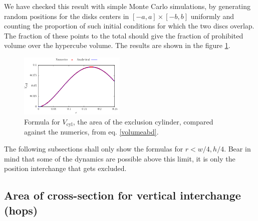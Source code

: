 \documentclass[letterpaper,10pt, jcp, aps]{revtex4-1}
\begin{document}



We have checked this result with simple Monte Carlo simulations, 
by generating random positions for the disks centers in 
$[-a,a] \times [-b,b]$ uniformly and 
counting the proportion of such initial conditions for 
which the two discs overlap. The fraction of these points to the 
total should give the fraction of prohibited volume over the hypercube
volume. The results are shown in the figure \ref{VolMonteC}.

\begin{figure}[h]
\centering
\includegraphics[width=0.45\textwidth]{./FigurasPerfectas/VolCyl02.pdf}
\caption{Formula for $V_\text{cyl}$, the area of the exclusion cylinder, compared
against the numerics, from eq. \ref{volumeabd}.
 }\label{VolMonteC}
\end{figure}

The following subsections shall only show the formulas for $r<w/4, h/4$.
Bear in mind that some of the dynamics are possible above this limit,
it is only the position interchange that gets excluded. \\



\subsection{Area of cross-section for
 vertical interchange (hops)}\label{areahop}
\end{document}
